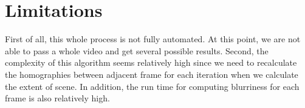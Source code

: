 \documentclass[12pt]{article}
\begin{document}
\section{Limitations}
First of all, this whole process is not fully automated. At this point, we are not able to pass a whole video and get several possible results. Second, the complexity of this algorithm seems relatively high since we need to recalculate the homographies between adjacent frame for each iteration when we calculate the extent of scene. In addition, the run time for computing blurriness for each frame is also relatively high. 
\end{document}
